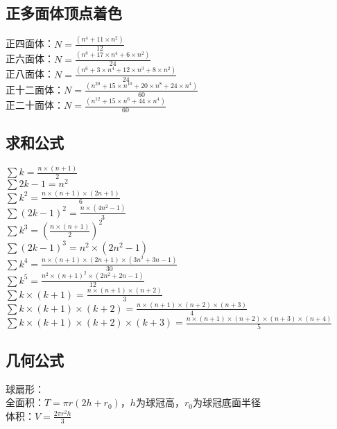 	\subsection{正多面体顶点着色}
	正四面体：$N = \frac{(n^{4}+11\times n^{2})}{12}$\\
	正六面体：$N = \frac{(n^{8}+17\times n^{4}+6\times n^{2})}{24}$\\
	正八面体：$N = \frac{(n^{6}+3\times n^{4}+12\times n^{3}+8\times n^{2})}{24}$\\
	正十二面体：$N = \frac{(n^{20}+15\times n^{10}+20\times n^{8}+24\times n^{4})}{60}$\\
	正二十面体：$N = \frac{(n^{12}+15\times n^{6}+44\times n^{4})}{60}$\\
	
	\subsection{求和公式}
	$\sum{k} = \frac{n\times (n+1)}{2}$\\
	$\sum{2k-1} = n^{2}$\\
	$\sum{k^{2}} = \frac{n\times (n+1)\times (2n+1)}{6}$\\
	$\sum{(2k-1)^{2}} = \frac{n\times (4n^{2}-1)}{3}$\\
	$\sum{k^{3}} = (\frac{n\times (n+1)}{2})^{2}$\\
	$\sum{(2k-1)^{3}} = n^{2}\times (2n^{2}-1)$\\
	$\sum{k^{4}} = \frac{n\times (n+1)\times (2n+1)\times (3n^{2}+3n-1)}{30}$\\
	$\sum{k^{5}} = \frac{n^{2}\times (n+1)^{2}\times (2n^{2}+2n-1)}{12}$\\
	$\sum{k\times (k+1)} = \frac{n\times (n+1)\times (n+2)}{3}$\\
	$\sum{k\times (k+1)\times (k+2)} = \frac{n\times (n+1)\times (n+2)\times (n+3)}{4}$\\
	$\sum{k\times (k+1)\times (k+2)\times (k+3)} = \frac{n\times (n+1)\times (n+2)\times (n+3)\times (n+4)}{5}$\\
	
	\subsection{几何公式}
	球扇形：\\
	全面积：$T = \pi r(2h+r_0)$，$h$为球冠高，$r_0$为球冠底面半径\\
	体积：$V = \frac{2\pi r^{2}h}{3}$\\
	
